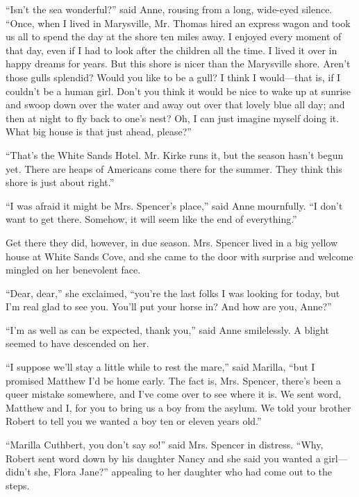 \documentclass[a4paper]{article}
\begin{document}
\Huge{``Isn't the sea wonderful?'' said Anne, rousing from a long, wide-eyed silence. ``Once, when I lived in Marysville, Mr. Thomas hired an express wagon and took us all to spend the day at the shore ten miles away. I enjoyed every moment of that day, even if I had to look after the children all the time. I lived it over in happy dreams for years. But this shore is nicer than the Marysville shore. Aren't those gulls splendid? Would you like to be a gull? I think I would---that is, if I couldn't be a human girl. Don't you think it would be nice to wake up at sunrise and swoop down over the water and away out over that lovely blue all day; and then at night to fly back to one's nest? Oh, I can just imagine myself doing it. What big house is that just ahead, please?''

\huge{``That's the White Sands Hotel. Mr. Kirke runs it, but the season hasn't begun yet. There are heaps of Americans come there for the summer. They think this shore is just about right.''

\LARGE{``I was afraid it might be Mrs. Spencer's place,'' said Anne mournfully. ``I don't want to get there. Somehow, it will seem like the end of everything.''


\Large{Get there they did, however, in due season. Mrs. Spencer lived in a big yellow house at White Sands Cove, and she came to the door with surprise and welcome mingled on her benevolent face.

\large{``Dear, dear,'' she exclaimed, ``you're the last folks I was looking for today, but I'm real glad to see you. You'll put your horse in? And how are you, Anne?''

\normalsize{``I'm as well as can be expected, thank you,'' said Anne smilelessly. A blight seemed to have descended on her.

\small{``I suppose we'll stay a little while to rest the mare,'' said Marilla, ``but I promised Matthew I'd be home early. The fact is, Mrs. Spencer, there's been a queer mistake somewhere, and I've come over to see where it is. We sent word, Matthew and I, for you to bring us a boy from the asylum. We told your brother Robert to tell you we wanted a boy ten or eleven years old.''

\footnotesize{``Marilla Cuthbert, you don't say so!'' said Mrs. Spencer in distress. ``Why, Robert sent word down by his daughter Nancy and she said you wanted a girl---didn't she, Flora Jane?'' appealing to her daughter who had come out to the steps.

}}}}}}}}
\end{document}
